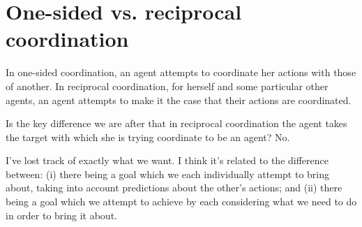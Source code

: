\documentclass[12pt,\papersize]{extarticle}
\begin{document}
\setlength\footnotesep{1em}


\author{}
\date{}



\setcounter{secnumdepth}{-1} 




\section{One-sided vs. reciprocal coordination}
In one-sided coordination, an agent attempts to coordinate her actions with those of another.
In reciprocal coordination, for herself and some particular other agents, an agent attempts to make it the case that their actions are coordinated.


Is the key difference we are after that in reciprocal coordination the agent takes the target with which she is trying coordinate to be an agent?
No.

I've lost track of exactly what we want.  
I think it's related to the difference between: (i) there being a goal which we each individually attempt to bring about, taking into account predictions about the other's actions; and (ii) there being a goal which we attempt to achieve by each considering what we need to do in order to bring it about.





\small

\end{document}
